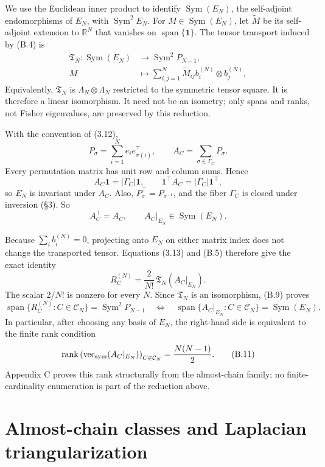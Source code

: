 \documentclass[11pt]{article}
\begin{document}
We use the Euclidean inner product to identify \(\operatorname{Sym}(E_N)\), the self-adjoint endomorphisms of \(E_N\), with \(\operatorname{Sym}^2E_N\). For \(M\in\operatorname{Sym}(E_N)\), let \(\widetilde M\) be its self-adjoint extension to \(\mathbb R^N\) that vanishes on \(\operatorname{span}\{\mathbf1\}\). The tensor transport induced by (B.4) is \[ \begin{aligned} \mathfrak T_N:\operatorname{Sym}(E_N) &\longrightarrow\operatorname{Sym}^2P_{N-1},\\ M&\longmapsto \sum_{i,j=1}^N \widetilde M_{ij} b_i^{(N)}\otimes b_j^{(N)}, \end{aligned} \tag{B.5} \] Equivalently, \(\mathfrak T_N\) is \(\Lambda_N\otimes\Lambda_N\) restricted to the symmetric tensor square. It is therefore a linear isomorphism. It need not be an isometry; only spans and ranks, not Fisher eigenvalues, are preserved by this reduction.

With the convention of (3.12), \[ P_\sigma=\sum_{i=1}^Ne_i e_{\sigma(i)}^\top, \qquad A_C=\sum_{\sigma\in\Gamma_C}P_\sigma. \tag{B.6} \] Every permutation matrix has unit row and column sums. Hence \[ A_C\mathbf1=|\Gamma_C|\mathbf1, \qquad \mathbf1^\top A_C=|\Gamma_C|\mathbf1^\top, \tag{B.7} \] so \(E_N\) is invariant under \(A_C\). Also, \(P_\sigma^\top=P_{\sigma^{-1}}\), and the fiber \(\Gamma_C\) is closed under inversion (\S3). So \[ A_C^\top=A_C, \qquad A_C|_{E_N}\in\operatorname{Sym}(E_N). \tag{B.8} \]

Because \(\sum_i b_i^{(N)}=0\), projecting onto \(E_N\) on either matrix index does not change the transported tensor. Equations (3.13) and (B.5) therefore give the exact identity \[ R_C^{(N)} =\frac2{N!}\, \mathfrak T_N\!\left(A_C|_{E_N}\right). \tag{B.9} \] The scalar \(2/N!\) is nonzero for every \(N\). Since \(\mathfrak T_N\) is an isomorphism, (B.9) proves \[ \operatorname{span}\{R_C^{(N)}:C\in\mathcal C_N\} =\operatorname{Sym}^2P_{N-1} \quad\Longleftrightarrow\quad \operatorname{span}\{A_C|_{E_N}:C\in\mathcal C_N\} =\operatorname{Sym}(E_N). \tag{B.10} \] In particular, after choosing any basis of \(E_N\), the right-hand side is equivalent to the finite rank condition \[ \operatorname{rank} \left( \operatorname{vec}_{\rm sym}(A_C|_{E_N}) \right)_{C\in\mathcal C_N} =\frac{N(N-1)}2. \tag{B.11} \] Appendix C proves this rank structurally from the almost-chain family; no finite-cardinality enumeration is part of the reduction above.

\section{Almost-chain classes and Laplacian triangularization}
\end{document}

